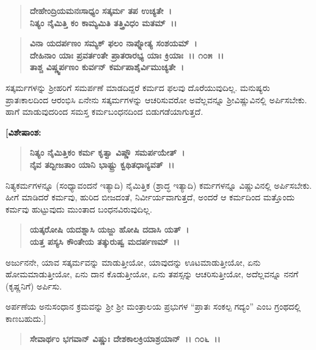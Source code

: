 \begin{verse}
\textbf{ದೇಹೇಂದ್ರಿಯಮನಃಸಾಧ್ಯಂ ಸತ್ಕರ್ಮ ತಪ ಉಚ್ಯತೇ~।}\\\textbf{ನಿತ್ಯಂ ನೈಮಿತ್ತಿ ಕಂ ಕಾಮ್ಯಮಿತಿ ತತ್ತ್ರಿವಿಧಂ ಮತಮ್~।।} 
\end{verse}

\begin{verse}
\textbf{ವಿನಾ ಯದರ್ಪಣಂ ಸಮ್ಯಕ್ ಫಲಂ ನಾಪ್ನೋತ್ಯ ಸಂಶಯಮ್~।}\\\textbf{ದೇಹಿನಾಂ ಯಾಃ ಪ್ರವರ್ತಂತೇ ಪ್ರಾತರಾರಭ್ಯ ಯಾಃ ಕ್ರಿಯಾಃ~।। ೧೦೫~।।}\\\textbf{ತಾಶ್ಚ ವಿಷ್ಣ್ವರ್ಪಣಂ ಕುರ್ವನ್‌ ಕರ್ಮಪಾಶೈರ್ವಿಮುಚ್ಯತೇ~।}
\end{verse}

ಸತ್ಕರ್ಮಗಳನ್ನು ಶ‍್ರೀಹರಿಗೆ ಸಮರ್ಪಣೆ ಮಾಡದಿದ್ದರೆ ಕರ್ಮದ ಫಲವು ದೊರೆಯುವುದಿಲ್ಲ. ಮನುಷ್ಯರು ಪ್ರಾತಃಕಾಲದಿಂದ ಆರಂಭಿಸಿ ಏನೇನು ಸತ್ಕರ್ಮಗಳನ್ನು ಆಚರಿಸುವರೋ ಅವೆಲ್ಲವನ್ನೂ ಶ‍್ರೀವಿಷ್ಣುವಿನಲ್ಲಿ ಅರ್ಪಿಸಬೇಕು. ಹಾಗೆ ಮಾಡುವುದರಿಂದ ಸಮಸ್ತ ಕರ್ಮಬಂಧನದಿಂದ ಬಿಡುಗಡೆಯಾಗುತ್ತದೆ.

\begin{flushleft}
\textbf{[ವಿಶೇಷಾಂಶ:}
\end{flushleft}

\begin{verse}
\textbf{ನಿತ್ಯಂ ನೈಮಿತ್ತಿಕಂ ಕರ್ಮ ಕೃತ್ವಾ ವಿಷ್ಣೌ ಸಮರ್ಪಯೇತ್~।}\\\textbf{ನೈವ ತದ್ಬೀಜತಾಂ ಯಾನಿ ಭಾಷ್ಟ್ರು ಕ್ವಥಿತಧಾನ್ಯವತ್~।।} 
\end{verse}

ನಿತ್ಯಕರ್ಮಗಳನ್ನೂ (ಸಂಧ್ಯಾವಂದನೆ ಇತ್ಯಾದಿ) ನೈಮಿತ್ತಿಕ (ಶ್ರಾದ್ಧ ಇತ್ಯಾದಿ) ಕರ್ಮಗಳನ್ನೂ ವಿಷ್ಣುವಿನಲ್ಲಿ ಅರ್ಪಿಸಬೇಕು. ಹೀಗೆ ಮಾಡಿದರೆ ಕರ್ಮವು, ಹುರಿದ ಬೀಜದಂತೆ, ನಿರ್ವೀರ್ಯವಾಗುತ್ತದೆ, ಅಂದರೆ ಆ ಕರ್ಮದಿಂದ ಮತ್ತೊಂದು ಕರ್ಮವು ಹುಟ್ಟುವುದು ಮುಂತಾದ ಬಂಧನವಿರುವುದಿಲ್ಲ.

\begin{verse}
\textbf{ಯತ್ಕರೋಷಿ ಯದಶ್ನಾಸಿ ಯಜ್ಜು ಹೋಷಿ ದದಾಸಿ ಯತ್~।}\\\textbf{ಯತ್ತ ಪಸ್ಯಸಿ ಕೌಂತೇಯ ತತ್ಕುರುಷ್ವ ಮದರ್ಪಣಮ್~।।} 
\end{verse}

ಅರ್ಜುನನೇ, ಯಾವ ಸತ್ಕರ್ಮವನ್ನು ಮಾಡುತ್ತೀಯೋ, ಯಾವುದನ್ನು ಊಟಮಾಡು\-ತ್ತೀಯೋ, ಏನು ಹೋಮಮಾಡುತ್ತೀಯೋ, ಏನು ದಾನ ಕೊಡುತ್ತೀಯೋ, ಏನು ತಪಸ್ಸನ್ನು ಆಚರಿಸುತ್ತೀಯೋ, ಅದೆಲ್ಲವನ್ನೂ ನನಗೆ (ಕೃಷ್ಣನಿಗೆ) ಅರ್ಪಿಸು.

ಅರ್ಪಣೆಯ ಅನುಸಂಧಾನ ಕ್ರಮವನ್ನು ಶ‍್ರೀ ಶ‍್ರೀ ಮಂತ್ರಾಲಯ ಪ್ರಭುಗಳ “ಪ್ರಾತಃ ಸಂಕಲ್ಪ ಗದ್ಯಂ” ಎಂಬ ಗ್ರಂಥದಲ್ಲಿ ಕಾಣಬಹುದು.]

\begin{verse}
\textbf{ಸೇವಾರ್ಥಂ ಭಗವಾನ್ ವಿಷ್ಣುಃ ದೇಶಕಾಲಕ್ರಿಯಾಶ್ರಯಾನ್~।। ೧೦೬~।।} 
\end{verse}


